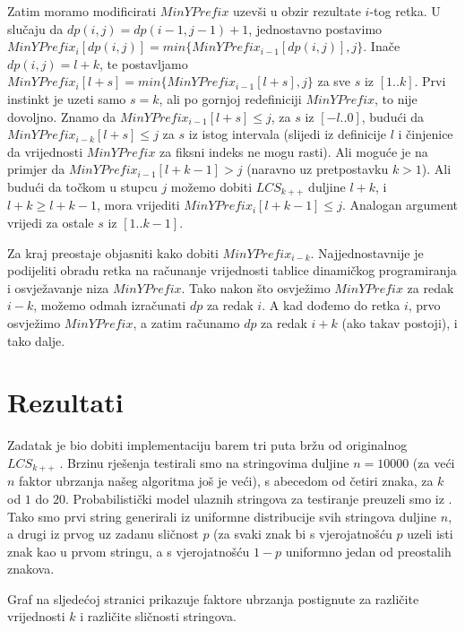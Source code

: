 \documentclass[times, utf8, seminar, numeric]{fer}
\begin{document}
Zatim moramo modificirati $MinYPrefix$ uzevši u obzir rezultate
$i$-tog retka. U slučaju da $dp(i, j) = dp(i-1,j-1)+1$,
jednostavno postavimo $MinYPrefix_i[dp(i,j)] =
min\{MinYPrefix_{i-1}[dp(i,j)], j\}$.  Inače $dp(i, j) = l+k$, te
postavljamo $MinYPrefix_i[l+s] = min\{MinYPrefix_{i-1}[l+s], j\}$
za sve $s$ iz $[1..k]$. Prvi instinkt je uzeti samo $s = k$, ali
po gornjoj redefiniciji $MinYPrefix$, to nije dovoljno. Znamo da
$MinYPrefix_{i-1}[l+s] \le j$, za $s$ iz $[-l..0]$, budući da
$MinYPrefix_{i-k}[l+s] \le j$ za $s$ iz istog intervala (slijedi iz
definicije $l$ i činjenice da vrijednosti $MinYPrefix$ za fiksni
indeks ne mogu rasti). Ali moguće je na primjer da
$MinYPrefix_{i-1}[l+k-1] > j$ (naravno uz pretpostavku $k > 1$).
Ali budući da točkom u stupcu $j$ možemo dobiti $LCS_{k++}$ duljine
$l+k$, i $l+k \ge l+k-1$, mora vrijediti $MinYPrefix_i[l+k-1] \le j$.
Analogan argument vrijedi za ostale $s$ iz $[1..k-1]$. 


Za kraj preostaje objasniti kako dobiti $MinYPrefix_{i-k}$.
Najjednostavnije je podijeliti obradu retka na računanje
vrijednosti tablice dinamičkog programiranja i osvježavanje niza
$MinYPrefix$. Tako nakon što osvježimo $MinYPrefix$ za redak
$i-k$, možemo odmah izračunati $dp$ za redak $i$. A kad dođemo do
retka $i$, prvo osvježimo $MinYPrefix$, a zatim računamo $dp$ za
redak $i+k$ (ako takav postoji), i tako dalje.

\chapter{Rezultati}
Zadatak je bio dobiti implementaciju barem tri puta bržu od
originalnog $LCS_{k++}$ \cite{github}. Brzinu rješenja testirali
smo na stringovima duljine $n = 10000$ (za veći $n$ faktor ubrzanja
našeg algoritma još je veći), s abecedom od četiri znaka, za $k$ od
$1$ do $20$. Probabilistički model ulaznih stringova za testiranje
preuzeli smo iz \cite{Pavetic}. Tako smo prvi string generirali iz
uniformne distribucije svih stringova duljine $n$, a drugi iz prvog
uz zadanu sličnost $p$ (za svaki znak bi s vjerojatnošću $p$ uzeli
isti znak kao u prvom stringu, a s vjerojatnošću $1-p$ uniformno
jedan od preostalih znakova.

Graf na sljedećoj stranici prikazuje faktore ubrzanja postignute za
različite vrijednosti $k$ i različite sličnosti stringova.
\end{document}
